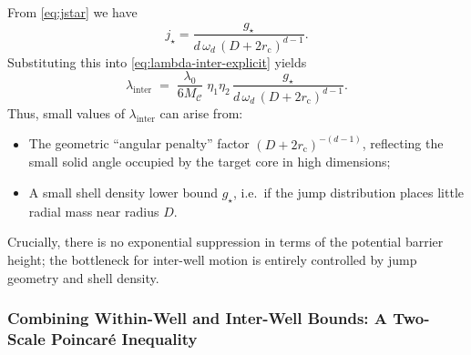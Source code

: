 From \eqref{eq:jstar} we have
\[
j_\star
=
\frac{g_\star}{d\,\omega_d\,(D+2r_{\mathrm c})^{d-1}}.
\]
Substituting this into \eqref{eq:lambda-inter-explicit} yields
\begin{equation}\label{eq:lambda-inter-shell}
\lambda_{\mathrm{inter}}
\;=\;
\frac{\lambda_0}{6M_{\mathcal C}}\;\eta_1\eta_2\,
\frac{g_\star}{d\,\omega_d\,(D+2r_{\mathrm c})^{d-1}}.
\end{equation}
Thus, small values of \(\lambda_{\mathrm{inter}}\) can arise from:
\begin{itemize}
  \item The geometric “angular penalty” factor
  \(
  (D+2r_{\mathrm c})^{-(d-1)}
  \),
  reflecting the small solid angle occupied by the target core in high dimensions;
  \item A small shell density lower bound \(g_\star\), i.e.\ if the jump
  distribution places little radial mass near radius \(D\).
\end{itemize}
Crucially, there is no exponential suppression in terms of the potential barrier
height; the bottleneck for inter-well motion is entirely controlled by jump
geometry and shell density.

\subsubsection{Combining Within-Well and Inter-Well Bounds: A Two-Scale Poincaré Inequality}
\label{sec:two-scale-PI}


